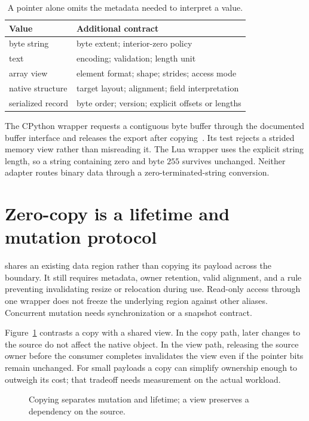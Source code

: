 \begin{table}[htbp]
\caption{A pointer alone omits the metadata needed to interpret a value.}
\label{tab:ch71-representations}
\centering
\begin{tabular}{ll}
\toprule
Value & Additional contract \\
\midrule
byte string & byte extent; interior-zero policy \\
text & encoding; validation; length unit \\
array view & element format; shape; strides; access mode \\
native structure & target layout; alignment; field interpretation \\
serialized record & byte order; version; explicit offsets or lengths \\
\bottomrule
\end{tabular}
\end{table}

The CPython wrapper requests a contiguous byte buffer through the documented buffer interface and releases the export after copying~\cite{python-2026-capi}.
Its test rejects a strided memory view rather than misreading it.
The Lua wrapper uses the explicit string length, so a string containing zero and byte $255$ survives unchanged.
Neither adapter routes binary data through a zero-terminated-string conversion.

\section{Zero-copy is a lifetime and mutation protocol}
\label{sec:ch71-zero-copy}
 shares an existing data region rather than copying its payload across the boundary.
It still requires metadata, owner retention, valid alignment, and a rule preventing invalidating resize or relocation during use.
Read-only access through one wrapper does not freeze the underlying region against other aliases.
Concurrent mutation needs synchronization or a snapshot contract.

Figure~\ref{fig:ch71-copy} contrasts a copy with a shared view.
In the copy path, later changes to the source do not affect the native object.
In the view path, releasing the source owner before the consumer completes invalidates the view even if the pointer bits remain unchanged.
For small payloads a copy can simplify ownership enough to outweigh its cost; that tradeoff needs measurement on the actual workload.

\begin{figure}[htbp]
\centering
{}
\caption{Copying separates mutation and lifetime; a view preserves a dependency on the source.}
\label{fig:ch71-copy}
\end{figure}

